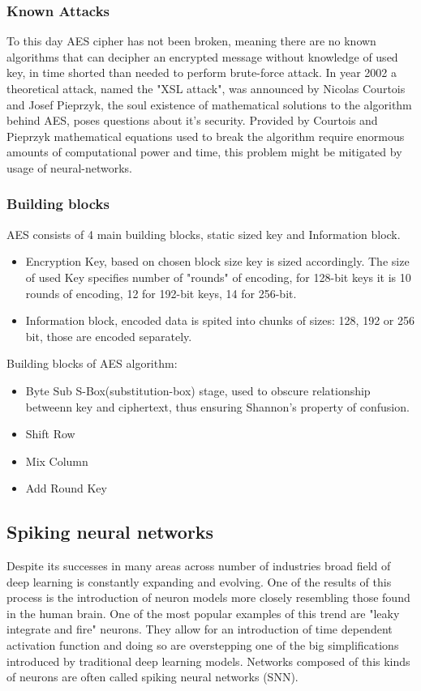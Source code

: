 \documentclass{article}
\begin{document}
\subsubsection{Known Attacks}
To this day AES cipher has not been broken, meaning there are no known algorithms that can decipher an encrypted message without knowledge of used key, in time shorted than needed to perform brute-force attack.
In year 2002 a theoretical attack, named the "XSL attack", was announced by Nicolas Courtois and Josef Pieprzyk, the soul existence of mathematical solutions to the algorithm behind AES, poses questions about it's security. Provided by Courtois and Pieprzyk mathematical equations used to break the algorithm require enormous amounts of computational power and time, this problem might be mitigated by usage of neural-networks.

\subsubsection{Building blocks}
AES consists of 4 main building blocks, static sized key and Information block. 

\begin{itemize}
\item Encryption Key, based on chosen block size key is sized accordingly. The size of used Key specifies number of "rounds" of encoding, for 128-bit keys it is 10 rounds of encoding, 12 for 192-bit keys, 14 for 256-bit. 
\item Information block, encoded data is spited into chunks of sizes: 128, 192 or 256 bit, those are encoded separately.  
\end{itemize}
Building blocks of AES algorithm:
\begin{itemize}
\item Byte Sub
S-Box(substitution-box) stage, used to obscure relationship betweenn key and ciphertext, thus ensuring Shannon's property of confusion.
\item Shift Row
\item Mix Column
\item Add Round Key
\end{itemize}

\subsection{Spiking neural networks}

Despite its successes in many areas across number of industries broad field of deep learning is constantly expanding and evolving. One of the results of this process is the introduction of neuron models more closely resembling those found in the human brain. One of the most popular examples of this trend are "leaky integrate and fire" neurons. They allow for an introduction of time dependent activation function and doing so are overstepping one of the big simplifications introduced by traditional deep learning models. Networks composed of this kinds of neurons are often called spiking neural networks (SNN).
\end{document}

